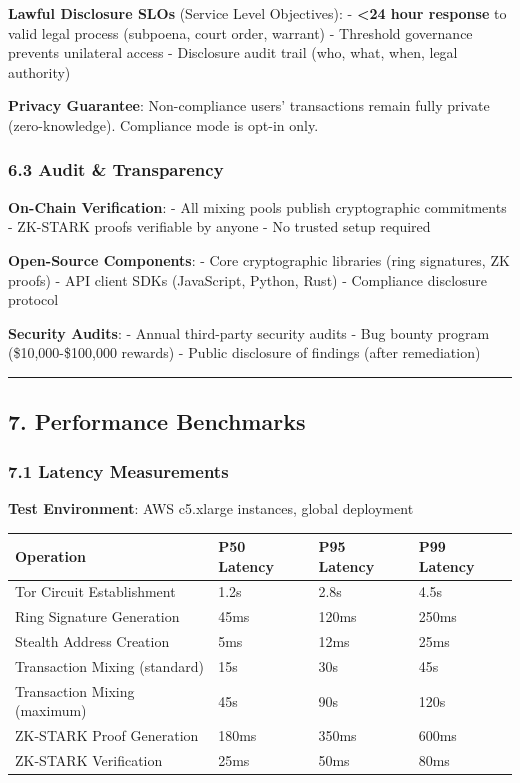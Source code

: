 \documentclass[
  11pt,
]{article}
\begin{document}
\textbf{Lawful Disclosure SLOs} (Service Level Objectives): -
\textbf{\textless24 hour response} to valid legal process (subpoena,
court order, warrant) - Threshold governance prevents unilateral access
- Disclosure audit trail (who, what, when, legal authority)

\textbf{Privacy Guarantee}: Non-compliance users' transactions remain
fully private (zero-knowledge). Compliance mode is opt-in only.

\hypertarget{audit-transparency}{%
\subsubsection{6.3 Audit \& Transparency}\label{audit-transparency}}

\textbf{On-Chain Verification}: - All mixing pools publish cryptographic
commitments - ZK-STARK proofs verifiable by anyone - No trusted setup
required

\textbf{Open-Source Components}: - Core cryptographic libraries (ring
signatures, ZK proofs) - API client SDKs (JavaScript, Python, Rust) -
Compliance disclosure protocol

\textbf{Security Audits}: - Annual third-party security audits - Bug
bounty program (\$10,000-\$100,000 rewards) - Public disclosure of
findings (after remediation)

\begin{center}\rule{0.5\linewidth}{0.5pt}\end{center}

\hypertarget{performance-benchmarks}{%
\subsection{7. Performance Benchmarks}\label{performance-benchmarks}}

\hypertarget{latency-measurements}{%
\subsubsection{7.1 Latency Measurements}\label{latency-measurements}}

\textbf{Test Environment}: AWS c5.xlarge instances, global deployment

\begin{longtable}[]{@{}llll@{}}
\toprule
Operation & P50 Latency & P95 Latency & P99 Latency \\
\midrule
\endhead
Tor Circuit Establishment & 1.2s & 2.8s & 4.5s \\
Ring Signature Generation & 45ms & 120ms & 250ms \\
Stealth Address Creation & 5ms & 12ms & 25ms \\
Transaction Mixing (standard) & 15s & 30s & 45s \\
Transaction Mixing (maximum) & 45s & 90s & 120s \\
ZK-STARK Proof Generation & 180ms & 350ms & 600ms \\
ZK-STARK Verification & 25ms & 50ms & 80ms \\
\bottomrule
\end{longtable}
\end{document}
